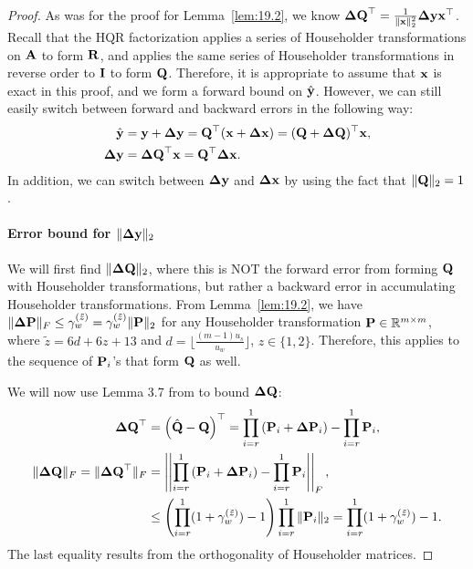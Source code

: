 \begin{proof}
	As was for the proof for Lemma~\ref{lem:19.2}, we know $\mathbf{\Delta Q}^{\top} = \frac{1}{\|\mathbf{x}\|_2^2}\mathbf{\Delta y}\mathbf{x}^{\top}$.
	Recall that the HQR factorization applies a series of Householder transformations on $\mathbf{A}$ to form $\mathbf{R}$, and applies the same series of Householder transformations in reverse order to $\mathbf{I}$ to form $\mathbf{Q}$.
	Therefore, it is appropriate to assume that $\mathbf{x}$ is exact in this proof, and we form a forward bound on $\hat{\mathbf{y}}$.
	However, we can still easily switch between forward and backward errors in the following way:
	\begin{align*}
	\hat{\mathbf{y}} &= \mathbf{y} + \mathbf{\Delta y} = \mathbf{Q}^{\top} (\mathbf{x}+\mathbf{\Delta x}) = (\mathbf{Q}+\mathbf{\Delta Q})^{\top} \mathbf{x},\\
	\mathbf{\Delta y} &= \mathbf{\Delta Q}^{\top} \mathbf{x} = \mathbf{Q}^{\top}\mathbf{\Delta x}.
	\end{align*}
	In addition, we can switch between $\mathbf{\Delta y}$ and $\mathbf{\Delta x}$ by using the fact that $\|\mathbf{Q}\|_2 = 1$.
	\paragraph{Error bound for $\|\mathbf{\Delta y}\|_2$}
	We will first find $\|\mathbf{\Delta Q}\|_2$, where this is NOT the forward error from forming $\mathbf{Q}$ with Householder transformations, but rather a backward error in accumulating Householder transformations. 
	From Lemma~\ref{lem:19.2}, we have$ \|\mathbf{\Delta P}\|_F\leq\gamma_w^{(\tilde{z})} = \gamma_w^{(\tilde{z})} \|\mathbf{P}\|_2$ for any Householder transformation $\mathbf{P}\in\mathbb{R}^{m\times m}$, where $\tilde{z} = 6d+6z+13$ and $d=\lfloor\frac{(m-1)u_s}{u_w}\rfloor$, $z\in\{1,2\}$.
	Therefore, this applies to the sequence of $\mathbf{P}_i$'s that form $\mathbf{Q}$ as well.
	
	We will now use Lemma 3.7 from \cite{Higham2002} to bound $\mathbf{\Delta Q}$:
	\begin{align*}
	\mathbf{\Delta Q}^{\top}& = \left(\hat{\mathbf{Q}} - \mathbf{Q}\right)^{\top}= \prod_{i=r}^{1}\left(\mathbf{P}_i +\mathbf{\Delta P}_i\right) - \prod_{i=r}^{1}\mathbf{P}_i,\\
	 \|\mathbf{\Delta Q}\|_F = \|\mathbf{\Delta Q}^{\top}\|_F  &= \left|\left| \prod_{i=r}^{1}\left(\mathbf{P}_i +\mathbf{\Delta P}_i\right) - \prod_{i=r}^{1}\mathbf{P}_i \right|\right|_F,\\
	&\leq \left(\prod_{i=r}^1(1+\gamma_w^{(\tilde{z})})-1\right)\prod_{i=r}^1\|\mathbf{P}_i\|_2 = \prod_{i=r}^1(1+\gamma_w^{(\tilde{z})})-1.
	\end{align*}
	The last equality results from the orthogonality of Householder matrices.\par
	

\end{proof}
